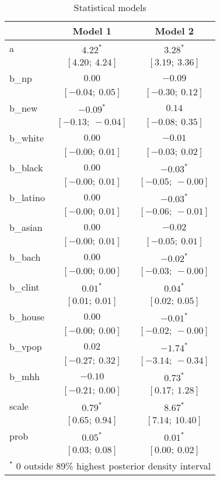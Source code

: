 
\begin{table}
\begin{center}
\begin{tabular}{l c c }
\hline
 & Model 1 & Model 2 \\
\hline
a         & $4.22^{*}$        & $3.28^{*}$        \\
          & $[4.20;\ 4.24]$   & $[3.19;\ 3.36]$   \\
b\_np     & $0.00$            & $-0.09$           \\
          & $[-0.04;\ 0.05]$  & $[-0.30;\ 0.12]$  \\
b\_new    & $-0.09^{*}$       & $0.14$            \\
          & $[-0.13;\ -0.04]$ & $[-0.08;\ 0.35]$  \\
b\_white  & $0.00$            & $-0.01$           \\
          & $[-0.00;\ 0.01]$  & $[-0.03;\ 0.02]$  \\
b\_black  & $0.00$            & $-0.03^{*}$       \\
          & $[-0.00;\ 0.01]$  & $[-0.05;\ -0.00]$ \\
b\_latino & $0.00$            & $-0.03^{*}$       \\
          & $[-0.00;\ 0.01]$  & $[-0.06;\ -0.01]$ \\
b\_asian  & $0.00$            & $-0.02$           \\
          & $[-0.00;\ 0.01]$  & $[-0.05;\ 0.01]$  \\
b\_bach   & $0.00$            & $-0.02^{*}$       \\
          & $[-0.00;\ 0.00]$  & $[-0.03;\ -0.00]$ \\
b\_clint  & $0.01^{*}$        & $0.04^{*}$        \\
          & $[0.01;\ 0.01]$   & $[0.02;\ 0.05]$   \\
b\_house  & $0.00$            & $-0.01^{*}$       \\
          & $[-0.00;\ 0.00]$  & $[-0.02;\ -0.00]$ \\
b\_vpop   & $0.02$            & $-1.74^{*}$       \\
          & $[-0.27;\ 0.32]$  & $[-3.14;\ -0.34]$ \\
b\_mhh    & $-0.10$           & $0.73^{*}$        \\
          & $[-0.21;\ 0.00]$  & $[0.17;\ 1.28]$   \\
scale     & $0.79^{*}$        & $8.67^{*}$        \\
          & $[0.65;\ 0.94]$   & $[7.14;\ 10.40]$  \\
prob      & $0.05^{*}$        & $0.01^{*}$        \\
          & $[0.03;\ 0.08]$   & $[0.00;\ 0.02]$   \\
\hline
\multicolumn{3}{l}{\scriptsize{$^*$ 0 outside 89\% highest posterior density interval}}
\end{tabular}
\caption{Statistical models}
\label{table:coefficients}
\end{center}
\end{table}
